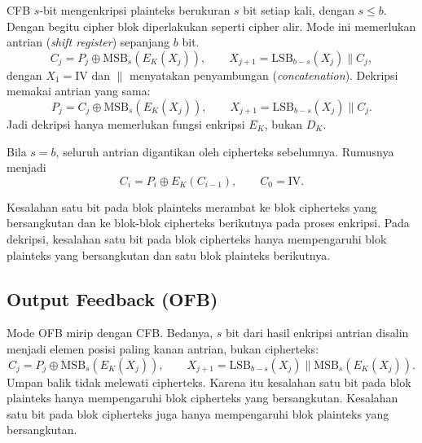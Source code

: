 CFB $s$-bit mengenkripsi plainteks berukuran $s$ bit setiap kali, dengan
$s \le b$. Dengan begitu cipher blok diperlakukan seperti cipher alir. Mode ini
memerlukan antrian (\textit{shift register}) sepanjang $b$ bit.
\begin{equation}
C_j = P_j \oplus \mathrm{MSB}_s(E_K(X_j)), \qquad
X_{j+1} = \mathrm{LSB}_{b-s}(X_j) \parallel C_j,
\label{eq:cfb-enkripsi}
\end{equation}
dengan $X_1 = \mathrm{IV}$ dan $\parallel$ menyatakan penyambungan
(\textit{concatenation}). Dekripsi memakai antrian yang sama:
\begin{equation}
P_j = C_j \oplus \mathrm{MSB}_s(E_K(X_j)), \qquad
X_{j+1} = \mathrm{LSB}_{b-s}(X_j) \parallel C_j.
\label{eq:cfb-dekripsi}
\end{equation}
Jadi dekripsi hanya memerlukan fungsi enkripsi $E_K$, bukan $D_K$.

Bila $s = b$, seluruh antrian digantikan oleh cipherteks sebelumnya. Rumusnya
menjadi
\begin{equation}
C_i = P_i \oplus E_K(C_{i-1}), \qquad C_0 = \mathrm{IV}.
\label{eq:cfb-blok}
\end{equation}

Kesalahan satu bit pada blok plainteks merambat ke blok cipherteks yang
bersangkutan dan ke blok-blok cipherteks berikutnya pada proses enkripsi. Pada
dekripsi, kesalahan satu bit pada blok cipherteks hanya mempengaruhi blok
plainteks yang bersangkutan dan satu blok plainteks berikutnya.

\subsection{Output Feedback (OFB)}

Mode OFB mirip dengan CFB. Bedanya, $s$ bit dari hasil enkripsi antrian disalin
menjadi elemen posisi paling kanan antrian, bukan cipherteks:
\begin{equation}
C_j = P_j \oplus \mathrm{MSB}_s(E_K(X_j)), \qquad
X_{j+1} = \mathrm{LSB}_{b-s}(X_j) \parallel \mathrm{MSB}_s(E_K(X_j)).
\label{eq:ofb}
\end{equation}
Umpan balik tidak melewati cipherteks. Karena itu kesalahan satu bit pada blok
plainteks hanya mempengaruhi blok cipherteks yang bersangkutan. Kesalahan satu
bit pada blok cipherteks juga hanya mempengaruhi blok plainteks yang
bersangkutan.

